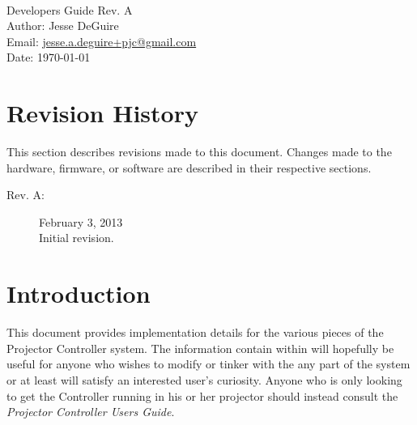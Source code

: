 \documentclass{article}
\newcommand{\docrev}{A}
\begin{document}
\frenchspacing

 \\
{\large Developers Guide} Rev. \docrev \\
Author: Jesse DeGuire \\
Email: \href{mailto:jesse.a.deguire+pjc@gmail.com}{jesse.a.deguire+pjc@gmail.com} \\
Date: \today \\

\tableofcontents

\let\stdsection\section
\renewcommand{\section}{\newpage\stdsection}

\addtolength{\parskip}{6pt}

\section*{Revision History}
This section describes revisions made to this document.  Changes made to the hardware, firmware, or
software are described in their respective sections.

\begin {description}
  \item[Rev. A:] February 3, 2013 \\
    Initial revision.
\end {description}

\section{Introduction}
This document provides implementation details for the various pieces of the Projector Controller
system.  The information contain within will hopefully be useful for anyone who wishes to modify or
tinker with the any part of the system or at least will satisfy an interested user's curiosity.
Anyone who is only looking to get the Controller running in his or her projector should instead
consult the \textit{Projector Controller Users Guide}.
\end{document}
